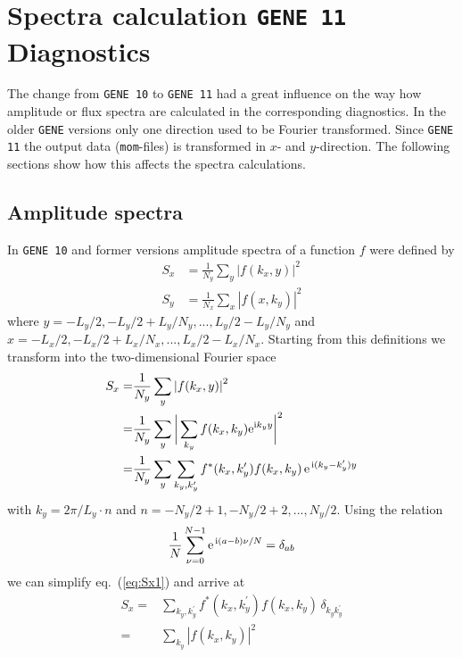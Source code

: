 \documentclass[12pt, a4paper, fleqn]{article}
\begin{document}
 

\section{Spectra calculation \texttt{GENE 11} Diagnostics}

The change from \texttt{GENE 10} to \texttt{GENE 11} had a great influence on the way how
amplitude or flux spectra are calculated in the corresponding diagnostics. In the older
\texttt{GENE} versions only one direction used to be Fourier transformed. 
Since \texttt{GENE 11} the output data (\texttt{mom}-files) is transformed 
in $x$- and $y$-direction. The following sections show how this affects the spectra
calculations.

\subsection{Amplitude spectra}
In \texttt{GENE 10} and former versions amplitude spectra of a function $f$ were defined by
\begin{align}
S_x &= \frac{1}{N_y} \sum_{y} \left|f(k_x, y)\right|^2 \\
S_y &= \frac{1}{N_x} \sum_{x} \left|f(x, k_y)\right|^2
\end{align}
where $y = -L_y/2, -L_y/2+L_y/N_y,..., L_y/2-L_y/N_y$ and $x= -L_x/2, -L_x/2+L_x/N_x,...,
L_x/2-L_x/N_x$.
Starting from this definitions we transform into the two-dimensional Fourier space
\begin{align}
S_x = & \frac{1}{N_y} \sum_y \left|f(k_x, y)\right|^2 \nonumber \\
 = & \frac{1}{N_y} \sum_y \bigg|\sum_{k_y} f(k_x,k_y)
 {\rm e}^{{\rm i} k_y y}\bigg|^2 \nonumber \\
 = & \frac{1}{N_y} \sum_y \sum_{k_y, k^{\prime}_y} f^*(k_x,k^{\prime}_y) f(k_x,k_y) \,{\rm
 e}^{\,{\rm
 i} (k_y-k^{\prime}_y) y} \label{eq:Sx1}
\end{align}
with $k_y = 2\pi/L_y \cdot n$ and $n =-N_y/2+1, -N_y/2+2,...,N_y/2$. Using the relation
\begin{equation}
\frac{1}{N} \sum_{\nu=0}^{N-1} {\rm e}^{\,{\rm i} (a-b)\nu/N} = \delta_{ab}
\end{equation}
we can simplify eq.~(\ref{eq:Sx1}) and arrive at
\begin{align}
S_x = & \sum_{k_y, k^{\prime}_y} f^*(k_x,k^{\prime}_y) f(k_x,k_y)
\,\delta_{k_y k^{\prime}_y} \nonumber \\
 = & \sum_{k_y} |f(k_x,k_y)|^2
\end{align}
\end{document}
